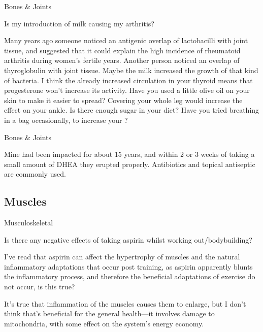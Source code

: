 \documentclass[11pt,oneside,openany,extrafontsizes]{memoir}
\begin{document}
\begin{qaexchange}{Bones \& Joints}

    \begin{question}
        Is my introduction of milk causing my arthritis?
    \end{question}

    \begin{answer}
       Many years ago someone noticed an antigenic overlap of lactobacilli with joint tissue, and suggested that it could explain the high incidence of rheumatoid arthritis during women's fertile years. Another person noticed an overlap of thyroglobulin with joint tissue. Maybe the milk increased the growth of that kind of bacteria. I think the already increased circulation in your thyroid means that progesterone won't increase its activity. Have you used a little olive oil on your skin to make it easier to spread? Covering your whole leg would increase the effect on your ankle. Is there enough sugar in your diet? Have you tried breathing in a bag occasionally, to increase your ?
    \end{answer}
\end{qaexchange}

\begin{standalonequote}{Bones \& Joints}

    \begin{answer}
      Mine had been impacted for about 15 years, and within 2 or 3 weeks of taking a small amount of DHEA they erupted properly. Antibiotics and topical antiseptic are commonly used.
    \end{answer}
\end{standalonequote}

\subsection{Muscles}

\begin{qaexchange}{Musculoskeletal}

    \begin{question}
        Is there any negative effects of taking aspirin whilst working out/bodybuilding?

I've read that aspirin can affect the hypertrophy of muscles and the natural inflammatory adaptations that occur post training, as aspirin apparently blunts the inflammatory process, and therefore the beneficial adaptations of exercise do not occur, is this true?
    \end{question}

    \begin{answer}
        It's true that inflammation of the muscles causes them to enlarge, but I don't think that's beneficial for the general health---it involves damage to mitochondria, with some effect on the system's energy economy.
    \end{answer}
\end{qaexchange}
\end{document}
